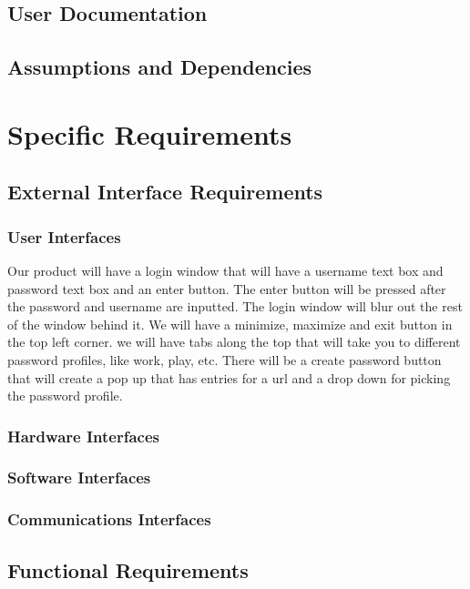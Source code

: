 \documentclass{report}
\begin{document}
\section{User Documentation}

\section{Assumptions and Dependencies}



\chapter{Specific Requirements}

\section{External Interface Requirements}

\subsection{User Interfaces}
Our product will have a login window that will have a username text box and password
text box and an enter button. The enter button will be pressed after the password 
and username are inputted. The login window will blur out the rest of the window
behind it.
We will have a minimize, maximize  and exit button in the top left corner. 
we will have tabs along the top that will take you to different password profiles,
like work, play, etc. 
There will be a create password button that will create a pop up that has entries
for a url and a drop down for picking the password profile. 
\subsection{Hardware Interfaces}

\subsection{Software Interfaces}

\subsection{Communications Interfaces}

\section{Functional Requirements}
\end{document}
